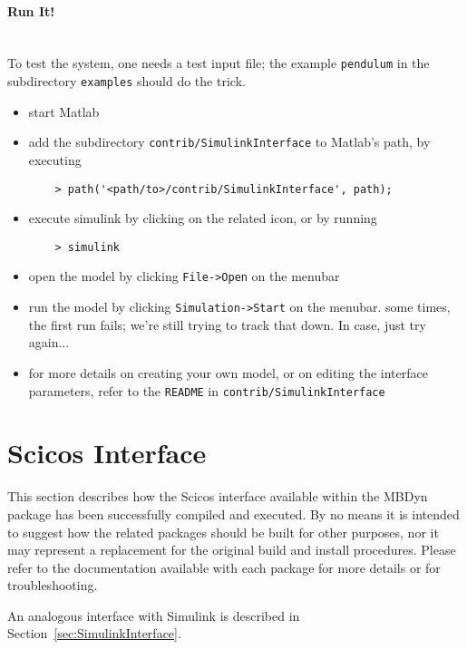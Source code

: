 \documentclass[10pt,dvips]{report}
\newcommand{\kw}[1]{\texttt{#1}}
\begin{document}
\paragraph{Run It!} \mbox{} \\
To test the system, one needs a test input file; the example 
\kw{pendulum} in the subdirectory \kw{examples} 
should do the trick.
\begin{itemize}
\item start Matlab
\item add the subdirectory \kw{contrib/SimulinkInterface} to Matlab's 
path, by executing
\begin{verbatim}
    > path('<path/to>/contrib/SimulinkInterface', path);
\end{verbatim}
\item execute simulink by clicking on the related icon, or by running
\begin{verbatim}
    > simulink
\end{verbatim}
\item open the model by clicking \kw{File->Open} on the menubar
\item run the model by clicking \kw{Simulation->Start} on the menubar.
some times, the first run fails; we're still trying to track that down.
In case, just try again...
\item for more details on creating your own model, or on editing
the interface parameters, refer to the \kw{README} 
in \kw{contrib/SimulinkInterface}
\end{itemize}

\section{Scicos Interface}
\label{sec:ScicosInterface}
This section describes how the Scicos \cite{SCICOS} interface available
within the MBDyn package has been successfully compiled and executed.
By no means it is intended to suggest how the related packages 
should be built for other purposes, nor it may represent a replacement
for the original build and install procedures.
Please refer to the documentation available with each package
for more details or for troubleshooting.

An analogous interface with Simulink \cite{SIMULINK}
is described in Section~\ref{sec:SimulinkInterface}.
\end{document}
